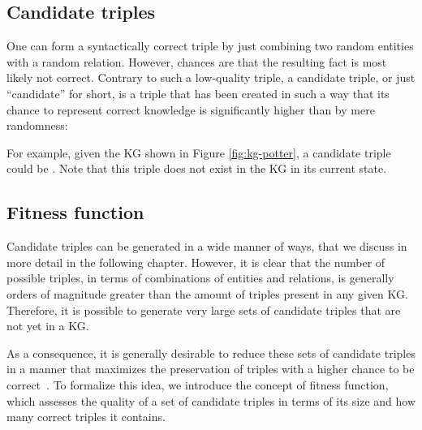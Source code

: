 \subsection{Candidate triples}
One can form a syntactically correct triple by just combining two random entities with a random relation. However, chances are that the resulting fact is most likely not correct. Contrary to such a low-quality triple, a candidate triple, or just ``candidate'' for short, is a triple that has been created in such a way that its chance to represent correct knowledge is significantly higher than by mere randomness:


For example, given the KG shown in Figure \ref{fig:kg-potter}, a candidate triple could be . Note that this triple does not exist in the KG in its current state.

\subsection{Fitness function}
Candidate triples can be generated in a wide manner of ways, that we discuss in more detail in the following chapter. However, it is clear that the number of possible triples, in terms of combinations of entities and relations, is generally orders of magnitude greater than the amount of triples present in any given KG. Therefore, it is possible to generate very large sets of candidate triples that are not yet in a KG.

As a consequence, it is generally desirable to reduce these sets of candidate triples in a manner that maximizes the preservation of triples with a higher chance to be correct~\cite{shen2022overview, borrego2019}. To formalize this idea, we introduce the concept of fitness function, which assesses the quality of a set of candidate triples in terms of its size and how many correct triples it contains.


